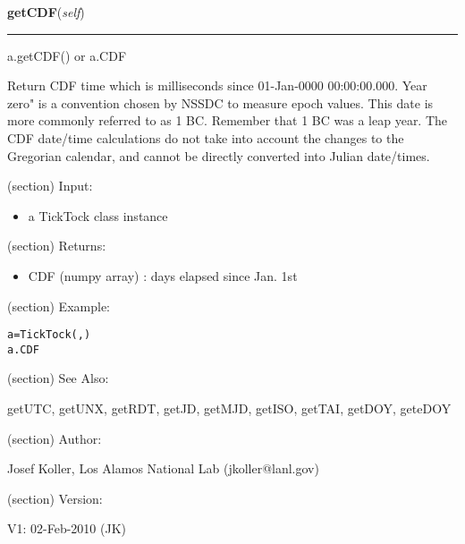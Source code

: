 \hspace{.8\funcindent}\begin{boxedminipage}{\funcwidth}

    \raggedright \textbf{getCDF}(\textit{self})

    \vspace{-1.5ex}

    \rule{\textwidth}{0.5\fboxrule}
\setlength{\parskip}{2ex}
    a.getCDF() or a.CDF

    Return CDF time which is milliseconds since 01-Jan-0000 00:00:00.000. 
    Year zero" is a convention chosen by NSSDC to measure epoch values. 
    This date is more commonly referred to as 1 BC. Remember that 1 BC was 
    a leap year. The CDF date/time calculations do not take into account 
    the changes to the Gregorian calendar, and cannot be directly converted
    into Julian date/times.

    (section) Input:

      \begin{itemize}
      \setlength{\parskip}{0.6ex}
        \item a TickTock class instance

      \end{itemize}

    (section) Returns:

      \begin{itemize}
      \setlength{\parskip}{0.6ex}
        \item CDF (numpy array) : days elapsed since Jan. 1st

      \end{itemize}

    (section) Example:

\begin{alltt}
\pysrcprompt{{\textgreater}{\textgreater}{\textgreater} }a = TickTock(, )
\pysrcprompt{{\textgreater}{\textgreater}{\textgreater} }a.CDF
\end{alltt}
    (section) See Also:

      getUTC, getUNX, getRDT, getJD, getMJD, getISO, getTAI, getDOY, 
      geteDOY

    (section) Author:

      Josef Koller, Los Alamos National Lab (jkoller@lanl.gov)

    (section) Version:

      V1: 02-Feb-2010 (JK)

\setlength{\parskip}{1ex}
    \end{boxedminipage}

